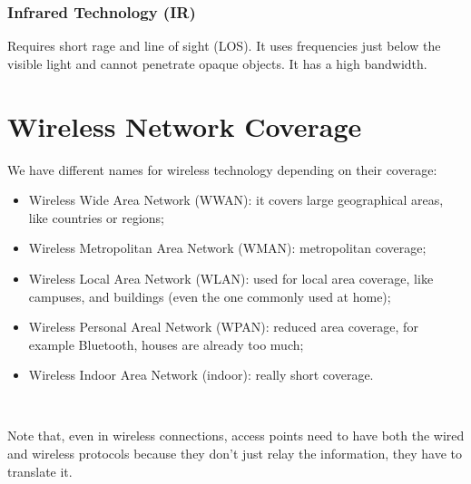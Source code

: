 \subsubsection{Infrared Technology (IR)}
Requires short rage and line of 
sight (LOS). It uses frequencies just below the visible light and cannot 
penetrate opaque objects. It has a high bandwidth.

\section{Wireless Network Coverage}
We have different names for wireless technology depending on their 
coverage:
\begin{itemize}
\item Wireless Wide Area Network (WWAN): it covers large 
  geographical areas, like countries or regions;
\item Wireless Metropolitan Area Network (WMAN): metropolitan 
  coverage;
\item Wireless Local Area Network (WLAN): used for local area 
  coverage, like campuses,  and buildings (even the one commonly used at home);
\item Wireless Personal Areal Network (WPAN): reduced area 
  coverage, for example Bluetooth, houses are already too much;
\item Wireless Indoor Area Network (indoor): really short 
  coverage.
\end{itemize}\

Note that, even in wireless connections, access points need to have both 
the wired and wireless protocols because they don't just relay the information, 
they have to translate it.

